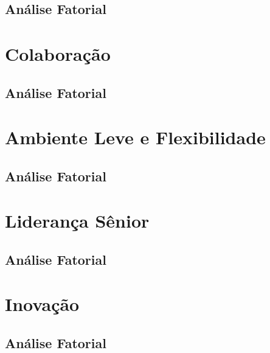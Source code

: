 \documentclass[]{book}
\begin{document}
\hypertarget{analise-fatorial-7}{%
\subsection{Análise Fatorial}\label{analise-fatorial-7}}

\hypertarget{colaboracao}{%
\section{Colaboração}\label{colaboracao}}

\hypertarget{analise-fatorial-8}{%
\subsection{Análise Fatorial}\label{analise-fatorial-8}}

\hypertarget{ambiente-leve-e-flexibilidade}{%
\section{Ambiente Leve e Flexibilidade}\label{ambiente-leve-e-flexibilidade}}

\hypertarget{analise-fatorial-9}{%
\subsection{Análise Fatorial}\label{analise-fatorial-9}}

\hypertarget{lideranca-senior}{%
\section{Liderança Sênior}\label{lideranca-senior}}

\hypertarget{analise-fatorial-10}{%
\subsection{Análise Fatorial}\label{analise-fatorial-10}}

\hypertarget{inovacao}{%
\section{Inovação}\label{inovacao}}

\hypertarget{analise-fatorial-11}{%
\subsection{Análise Fatorial}\label{analise-fatorial-11}}
\end{document}
